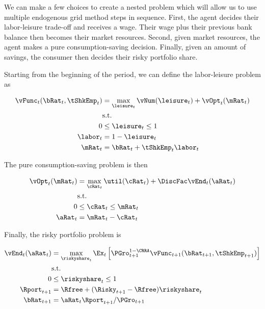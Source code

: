 \documentclass[\econtexRoot/SequentialEGM]{subfiles}
\begin{document}
We can make a few choices to create a nested problem which will allow us to use multiple endogenous grid method steps in sequence. First, the
agent decides their labor-leisure trade-off and receives a wage. Their wage
plus their previous bank balance then becomes their market resources. Second, given
market resources, the agent makes a pure consumption-saving decision. Finally, given an amount of savings, the consumer then decides their risky portfolio share.

Starting from the beginning of the period, we can define the labor-leisure problem as

\begin{equation}
        \begin{split}
                \vFunc_{t}(\bRat_{t}, \tShkEmp_{t}) & = \max_{ \leisure_{t}}
                \vNum(\leisure_{t}) + \vOpt_{t} (\mRat_{t}) \\
                & \text{s.t.} \\
                0 & \leq \leisure_{t} \leq 1 \\
                \labor_{t} & = 1 - \leisure_{t} \\
                \mRat_{t} & = \bRat_{t} + \tShkEmp_{t}\labor_{t} \\
        \end{split}
\end{equation}

The pure consumption-saving problem is then

\begin{equation}
        \begin{split}
                \vOpt_{t}(\mRat_{t}) & = \max_{\cRat_{t}} \util(\cRat_{t}) + \DiscFac\vEnd_{t}(\aRat_{t}) \\
                & \text{s.t.} \\
                0 & \leq \cRat_{t} \leq \mRat_{t} \\
                \aRat_{t} & = \mRat_{t} - \cRat_{t}
        \end{split}
\end{equation}

Finally, the risky portfolio problem is

\begin{equation}
        \begin{split}
                \vEnd_{t}(\aRat_{t}) & = \max_{\riskyshare_{t}}
                \Ex_{t} \left[ \PGro_{t+1}^{1-\CRRA}
                        \vFunc_{t+1}(\bRat_{t+1},
                        \tShkEmp_{t+1}) \right] \\
                & \text{s.t.} \\
                0 & \leq \riskyshare_{t} \leq 1 \\
                \Rport_{t+1} & = \Rfree + (\Risky_{t+1} - \Rfree)
                \riskyshare_{t} \\
                \bRat_{t+1} & = \aRat_{t} \Rport_{t+1} / \PGro_{t+1}
        \end{split}
\end{equation}
\end{document}
